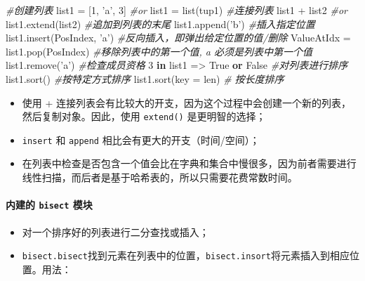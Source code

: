\documentclass[]{article}
\newenvironment{Shaded}{}{}
\newcommand{\KeywordTok}[1]{\textcolor[rgb]{0.00,0.44,0.13}{\textbf{#1}}}
\newcommand{\DecValTok}[1]{\textcolor[rgb]{0.25,0.63,0.44}{#1}}
\newcommand{\StringTok}[1]{\textcolor[rgb]{0.25,0.44,0.63}{#1}}
\newcommand{\CommentTok}[1]{\textcolor[rgb]{0.38,0.63,0.69}{\textit{#1}}}
\newcommand{\VariableTok}[1]{\textcolor[rgb]{0.10,0.09,0.49}{#1}}
\newcommand{\OperatorTok}[1]{\textcolor[rgb]{0.40,0.40,0.40}{#1}}
\newcommand{\BuiltInTok}[1]{#1}
\newcommand{\NormalTok}[1]{#1}
\let\oldparagraph\paragraph
\renewcommand{\paragraph}[1]{\oldparagraph{#1}\mbox{}}
\begin{document}
\begin{Shaded}
\begin{Highlighting}[]
\CommentTok{#创建列表}
\NormalTok{list1 }\OperatorTok{=}\NormalTok{ [}\DecValTok{1}\NormalTok{, }\StringTok{'a'}\NormalTok{, }\DecValTok{3}\NormalTok{]}
\CommentTok{#or}
\NormalTok{list1 }\OperatorTok{=} \BuiltInTok{list}\NormalTok{(tup1)}
\CommentTok{#连接列表}
\NormalTok{list1 }\OperatorTok{+}\NormalTok{ list2 }
\CommentTok{#or}
\NormalTok{list1.extend(list2)}
\CommentTok{#追加到列表的末尾}
\NormalTok{list1.append(}\StringTok{'b'}\NormalTok{)}
\CommentTok{#插入指定位置}
\NormalTok{list1.insert(PosIndex, }\StringTok{'a'}\NormalTok{)}
\CommentTok{#反向插入，即弹出给定位置的值/删除}
\NormalTok{ValueAtIdx }\OperatorTok{=}\NormalTok{ list1.pop(PosIndex)}
\CommentTok{#移除列表中的第一个值, a 必须是列表中第一个值}
\NormalTok{list1.remove(}\StringTok{'a'}\NormalTok{)}
\CommentTok{#检查成员资格}
\DecValTok{3} \KeywordTok{in}\NormalTok{ list1 }\OperatorTok{=>} \VariableTok{True} \KeywordTok{or} \VariableTok{False}
\CommentTok{#对列表进行排序}
\NormalTok{list1.sort()}
\CommentTok{#按特定方式排序}
\NormalTok{list1.sort(key }\OperatorTok{=} \BuiltInTok{len}\NormalTok{) }\CommentTok{# 按长度排序}
\end{Highlighting}
\end{Shaded}

\begin{itemize}
\item
  使用 +
  连接列表会有比较大的开支，因为这个过程中会创建一个新的列表，然后复制对象。因此，使用
  \texttt{extend()} 是更明智的选择；
\item
  \texttt{insert} 和 \texttt{append} 相比会有更大的开支（时间/空间）；
\item
  在列表中检查是否包含一个值会比在字典和集合中慢很多，因为前者需要进行线性扫描，而后者是基于哈希表的，所以只需要花费常数时间。
\end{itemize}

\paragraph{\texorpdfstring{内建的 \texttt{bisect}
模块}{内建的 bisect 模块}}\label{header-n152}

\begin{itemize}
\item
  对一个排序好的列表进行二分查找或插入；
\item
  \texttt{bisect.bisect}找到元素在列表中的位置，\texttt{bisect.insort}将元素插入到相应位置。用法：
\end{itemize}
\end{document}
